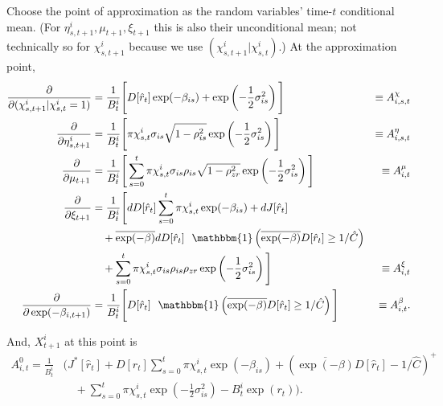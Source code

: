 Choose the point of approximation as the random variables' time-$t$ conditional mean. (For $\eta_{s,t+1}^i,\mu_{t+1},\xi_{t+1}$ this is also their unconditional mean; not technically so for $\chi_{s,t+1}^i$ because we use $(\chi_{s,t+1}^i|\chi_{s,t}^i)$.) At the approximation point,
\begin{align*}
\frac{\partial}{\partial (\chi_{s,t+1}^i|\chi_{s,t}^i=1)}
    &= \frac{1}{B_t^i}\Bigg[
    D[\hat r_t]\exp(-\beta_{is})  + \exp\left(-\frac{1}{2}\sigma_{is}^2 \right)\Bigg] &\equiv A^\chi_{i,s,t}\\
\frac{\partial}{\partial \eta_{s,t+1}^i} 
    &= \frac{1}{B_t^i}\Bigg[ 
    \pi\chi_{s,t}^i\sigma_{is}\sqrt{1-\rho_{is}^2} \exp\left(-\frac{1}{2}\sigma_{is}^2\right) 
    \Bigg] &\equiv A^\eta_{i,s,t}\\
\frac{\partial}{\partial \mu_{t+1}}
    &= \frac{1}{B_t^i}\Bigg[
    \sum_{s=0}^{t} \pi \chi_{s,t}^i \sigma_{is}\rho_{is}\sqrt{1-\rho_{zr}^2}
    \exp\left(-\frac{1}{2}\sigma_{is}^2\right)
    \Bigg] &\equiv A^\mu_{i,t}\\
\frac{\partial}{\partial \xi_{t+1}}
    &= \frac{1}{B_t^i}\Bigg[
    dD[\hat r_t]\sum_{s=0}^{t} \pi\chi_{s,t}^i\exp(-\beta_{is}) + dJ[\hat{r}_t] \\
    &\quad + \overline{\exp(-\beta)}dD[\hat{r}_t]
 \ \ \mathbbm{1}\left({\overline{\exp(-\beta)} D[\hat r_t] \geq 1/\hat C}\right) 
\\ &\quad + \sum_{s=0}^{t}\pi \chi_{s,t}^i\sigma_{is}\rho_{is}\rho_{zr}\exp\left(-\frac{1}{2}\sigma_{is}^2\right)
    \Bigg] &\equiv A^\xi_{i,t}\\
\frac{\partial}{\partial \exp(-\beta_{i,t+1})}
    &= \frac{1}{B_t^i}
    \Bigg[D[\hat r_t] 
 \ \ {\mathbbm{1}}\left({\overline{\exp(-\beta)} D[\hat r_t] \geq 1/\hat C}\right)\Bigg] &\equiv A^\beta_{i,t}.
\end{align*}


And, $X_{t+1}^i$ at this point is 
\begin{align*} A_{i,t}^0 = 
\frac{1}{B_t^i}&\Bigg( J^*[\hat{r}_t] + D[\hat r_{t}] \sum_{s = 0}^{t} \pi\chi_{s, t}^i  \exp(-\beta_{is}) + \left( \overline{\exp(- \beta)} D[\hat{r}_{t}] - 1/\hat C\right)^+ \\
&\quad+   \sum_{s = 0}^t \pi\chi_{s, t}^i\exp\left(-\frac{1}{2}\sigma_{is}^2\right) - B_t^i \exp(r_t)\Bigg).
\end{align*}

